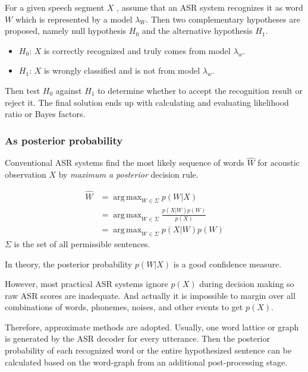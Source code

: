 \documentclass[11pt,a4paper]{report}
\DeclareMathOperator*{\argmax}{arg\,max}
\begin{document}
For a given speech segment \(X\) , assume that an ASR system recognizes it as word \(W\) which is represented by a model \(\lambda_W\).
Then two complementary hypotheses are proposed, namely null hypothesis \(H_0\) and the alternative hypothesis \(H_1\).

\begin{itemize}
  \item \(H_0\): \(X\) is correctly recognized and truly comes from model \(\lambda_w\).
  \item \(H_1\): \(X\) is wrongly classified and is not from model \(\lambda_w\).
\end{itemize}

Then test \(H_0\) against \(H_1\) to determine whether to accept the recognition result or reject it.
The final solution ends up with calculating and evaluating likelihood ratio or Bayes factors.

\subsubsection{As posterior probability}

Conventional ASR systems find the most likely sequence of words \(\hat{W}\) for acoustic observation \(X\) by \textit{maximum a posterior} decision rule.

\begin{equation}
  \begin{split}
    \hat{W} & = \argmax_{W \in \Sigma} p(W|X) \\
      & = \argmax_{W \in \Sigma} \frac{p(X|W) p(W)}{p(X)} \\
      & = \argmax_{W \in \Sigma} p(X|W) p(W)
  \end{split}
\end{equation}
\(\Sigma\) is the set of all permissible sentences.

In theory, the posterior probability \(p(W|X)\) is a good confidence measure.

However, most practical ASR systems ignore \(p(X)\) during decision making so raw ASR scores are inadequate.
And actually it is impossible to margin over all combinations of words, phonemes, noises, and other events to get \(p(X)\).

Therefore, approximate methods are adopted.
Usually, one word lattice or graph is generated by the ASR decoder for every utterance.
Then the posterior probability of each recognized word or the entire hypothesized sentence can be calculated based on the word-graph from an additional post-processing stage.
\end{document}
